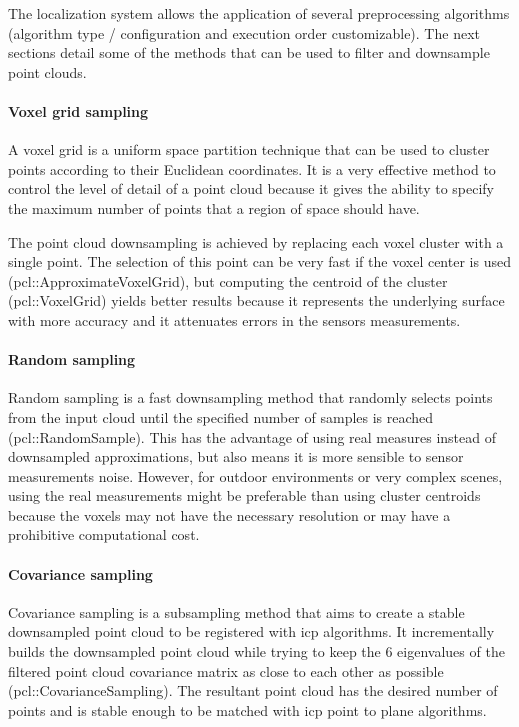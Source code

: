 The localization system allows the application of several preprocessing algorithms (algorithm type / configuration and execution order customizable). The next sections detail some of the methods that can be used to filter and downsample point clouds.


\paragraph{Voxel grid sampling}

A voxel grid is a uniform space partition technique that can be used to cluster points according to their Euclidean coordinates. It is a very effective method to control the level of detail of a point cloud because it gives the ability to specify the maximum number of points that a region of space should have.

The point cloud downsampling is achieved by replacing each voxel cluster with a single point. The selection of this point can be very fast if the voxel center is used (pcl::ApproximateVoxelGrid), but computing the centroid of the cluster (pcl::VoxelGrid) yields better results because it represents the underlying surface with more accuracy and it attenuates errors in the sensors measurements.


\paragraph{Random sampling}

Random sampling \cite{Vitter1984} is a fast downsampling method that randomly selects points from the input cloud until the specified number of samples is reached (pcl::RandomSample). This has the advantage of using real measures instead of downsampled approximations, but also means it is more sensible to sensor measurements noise. However, for outdoor environments or very complex scenes, using the real measurements might be preferable than using cluster centroids because the voxels may not have the necessary resolution or may have a prohibitive computational cost.


\paragraph{Covariance sampling}

Covariance sampling \cite{Gelfand} is a subsampling method that aims to create a stable downsampled point cloud to be registered with \gls{icp} algorithms. It incrementally builds the downsampled point cloud while trying to keep the 6 eigenvalues of the filtered point cloud covariance matrix as close to each other as possible (pcl::CovarianceSampling). The resultant point cloud has the desired number of points and is stable enough to be matched with \gls{icp} point to plane algorithms.


